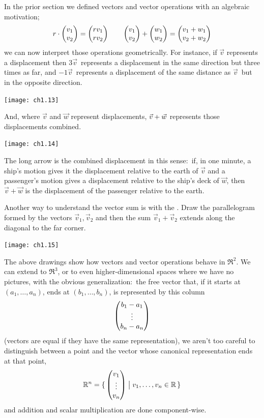 In the prior section we defined vectors and vector operations
with an algebraic motivation;
\begin{equation*}
   r\cdot\begin{pmatrix} v_1 \\ v_2 \end{pmatrix}
   =
   \begin{pmatrix} rv_1 \\ rv_2 \end{pmatrix}
  \qquad
   \begin{pmatrix} v_1 \\  v_2 \end{pmatrix}
   +
   \begin{pmatrix} w_1 \\ w_2 \end{pmatrix}
   =
   \begin{pmatrix} v_1+w_1 \\ v_2+w_2 \end{pmatrix}
\end{equation*}
we can now interpret those operations geometrically.
For instance, if \( \vec{v} \) represents a displacement
then \( 3\vec{v}\, \) represents a displacement in the same direction but 
three times as far,
and \( -1\vec{v}\, \) represents a displacement of the same distance as
\( \vec{v}\, \) but in the opposite direction.
\begin{center}
  \texttt{[image: ch1.13]}
\end{center}
And, where \( \vec{v} \) and \( \vec{w} \) represent displacements,
\( \vec{v}+\vec{w}\/ \) represents those displacements combined.
\begin{center}
  \texttt{[image: ch1.14]}
\end{center}
The long arrow is the combined displacement in this sense:~if, in one minute, 
a ship's motion gives it the displacement 
relative to the earth of $\vec{v}$ and a passenger's
motion gives a displacement relative to the ship's deck of $\vec{w}$,
then $\vec{v}+\vec{w}$ is the
displacement of the passenger relative to the earth.

Another way to understand the vector sum is with the
.%
Draw the parallelogram 
formed by the vectors $\vec{v}_1,\vec{v}_2$
and then the sum $\vec{v}_1+\vec{v}_2$ extends along the diagonal 
to the far corner.
\begin{center}
  \texttt{[image: ch1.15]}
\end{center}

The above drawings show how vectors and vector operations
behave in \( \Re^2 \).
We can extend to $\Re^3$, or to even higher-dimensional spaces
where we have no pictures, with the obvious generalization:~the 
free vector that, 
if it starts at \( (a_1,\ldots,a_n) \), ends at \( (b_1,\ldots,b_n) \), 
is represented by this column
\begin{equation*}
  \begin{pmatrix} b_1-a_1 \\ \vdots \\ b_n-a_n \end{pmatrix}
\end{equation*}
(vectors are equal if they have the same representation),
we aren't too careful to distinguish between a point and the vector whose
canonical representation ends at that point, 
\begin{equation*}
  \mathbb{R}^n=
  \mbox{$\{\,\begin{pmatrix} v_1 \\ \vdots \\ v_n \end{pmatrix}\bigm| v_1,\ldots,v_n\in\mathbb{R}\,\}$}
\end{equation*}
and addition and scalar multiplication are done component-wise.

